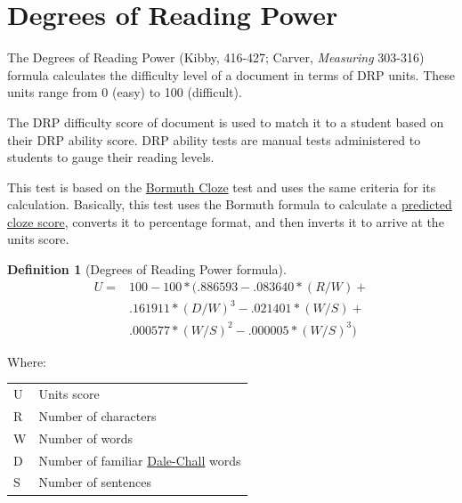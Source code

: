 \documentclass[
]{book}
\theoremstyle{definition}
\newtheorem{definition}{Definition}[chapter]
\theoremstyle{definition}
\theoremstyle{definition}
\theoremstyle{definition}
\theoremstyle{remark}
\begin{document}
\newpage

\hypertarget{degrees-of-reading-power}{%
\section{\texorpdfstring{Degrees of Reading Power}{Degrees of Reading Power}}\label{degrees-of-reading-power}}

The Degrees of Reading Power (Kibby, 416-427; Carver, \emph{Measuring} 303-316) formula calculates the difficulty level of a document in terms of DRP units. These units range from 0 (easy) to 100 (difficult).

The DRP difficulty score of document is used to match it to a student based on their DRP ability score. DRP ability tests are manual tests administered to students to gauge their reading levels.

This test is based on the \protect\hyperlink{bormuth-cloze-mean-machine-passage}{Bormuth Cloze} test and uses the same criteria for its calculation. Basically, this test uses the Bormuth formula to calculate a \protect\hyperlink{cloze}{predicted cloze score}, converts it to percentage format, and then inverts it to arrive at the units score.

\begin{definition}[Degrees of Reading Power formula]
\protect\hypertarget{def:drp}{}{\label{def:drp} {} }\begin{align*}
  U = & 100 - 100*(.886593 - .083640*(R/W) + \\
      & .161911*(D/W)^3 - .021401*(W/S) + \\
      & .000577*(W/S)^2 - .000005*(W/S)^3)
\end{align*}
\end{definition}

Where:

\begin{longtable}[]{@{}
  >{\raggedright\arraybackslash}p{}
  >{\raggedright\arraybackslash}p{}@{}}
\toprule
\endhead
U & Units score \\
R & Number of characters \\
W & Number of words \\
D & Number of familiar \protect\hyperlink{dale-chall-test}{Dale-Chall} words \\
S & Number of sentences \\
\bottomrule
\end{longtable}
\end{document}
